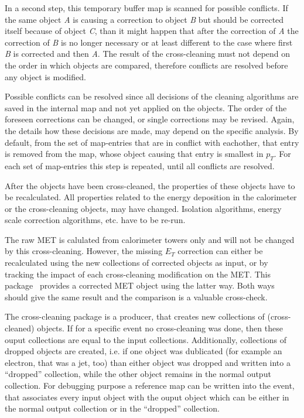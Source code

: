 \documentclass{cmspaper}
\begin{document}
In a second step, this temporary buffer map is scanned for possible conflicts.
If the same object {\it A} is causing a correction to object {\it B} but should
be corrected itself because of object {\it C}, than it might happen that after
the correction of {\it A} the correction of {\it B} is no longer necessary or at
least different to the case where first {\it B} is corrected and then {\it A}.
The result of the cross-cleaning must not depend on the order in which objects
are compared, therefore conflicts are resolved before any object is
modified.

Possible conflicts can be resolved since all decisions of the cleaning
algorithms are saved in the internal map and not yet applied on the objects. The
order of the foreseen corrections can be changed, or single corrections may be
revised. Again, the details how these decisions are made, may depend on the
specific analysis. 
%
By default, from the set of map-entries that are in conflict with eachother,
that entry is removed from the map, whose object causing that entry is smallest
in $p_T$. For each set of map-entries this step is repeated, until all conflicts
are resolved.

After the objects have been cross-cleaned, the properties of these objects have
to be recalculated. All properties related to the energy deposition in the
calorimeter or the cross-cleaning objects, may have changed. Isolation
algorithms, energy scale correction algorithms, etc. have to be re-run.

The raw MET is calulated from calorimeter towers only and will not be changed by
this cross-cleaning. However, the missing $E_T$ correction can either be
recalculated using the new collections of corrected objects as input, or by
tracking the impact of each cross-cleaning modification on the MET. This
package~\cite{package} provides a corrected MET object using the latter way.
Both ways should give the same result and the comparison is a valuable
cross-check. 

The cross-cleaning package is a producer, that creates new collections of
(cross-cleaned) objects. If for a specific event no cross-cleaning was done,
then these ouput collections are equal to the input collections. Additionally,
collections of dropped objects are created, i.e. if one object was dublicated
(for example an electron, that was a jet, too) than either object was dropped
and written into a ``dropped'' collection, while the other object remains in the
normal output collection. 
For debugging purpose a reference map can be written into the event, that
associates every input object with the ouput object which can be either in the
normal output collection or in the ``dropped'' collection.
\end{document}
